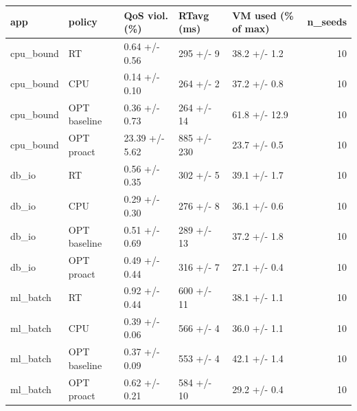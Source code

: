 \begin{tabular}{lllllr}
\toprule
app & policy & QoS viol. (\%) & RTavg (ms) & VM used (\% of max) & n\_seeds \\
\midrule
cpu\_bound & RT & 0.64 +/- 0.56 & 295 +/- 9 & 38.2 +/- 1.2 & 10 \\
cpu\_bound & CPU & 0.14 +/- 0.10 & 264 +/- 2 & 37.2 +/- 0.8 & 10 \\
cpu\_bound & OPT baseline & 0.36 +/- 0.73 & 264 +/- 14 & 61.8 +/- 12.9 & 10 \\
cpu\_bound & OPT proact & 23.39 +/- 5.62 & 885 +/- 230 & 23.7 +/- 0.5 & 10 \\
db\_io & RT & 0.56 +/- 0.35 & 302 +/- 5 & 39.1 +/- 1.7 & 10 \\
db\_io & CPU & 0.29 +/- 0.30 & 276 +/- 8 & 36.1 +/- 0.6 & 10 \\
db\_io & OPT baseline & 0.51 +/- 0.69 & 289 +/- 13 & 37.2 +/- 1.8 & 10 \\
db\_io & OPT proact & 0.49 +/- 0.44 & 316 +/- 7 & 27.1 +/- 0.4 & 10 \\
ml\_batch & RT & 0.92 +/- 0.44 & 600 +/- 11 & 38.1 +/- 1.1 & 10 \\
ml\_batch & CPU & 0.39 +/- 0.06 & 566 +/- 4 & 36.0 +/- 1.1 & 10 \\
ml\_batch & OPT baseline & 0.37 +/- 0.09 & 553 +/- 4 & 42.1 +/- 1.4 & 10 \\
ml\_batch & OPT proact & 0.62 +/- 0.21 & 584 +/- 10 & 29.2 +/- 0.4 & 10 \\
\bottomrule
\end{tabular}
